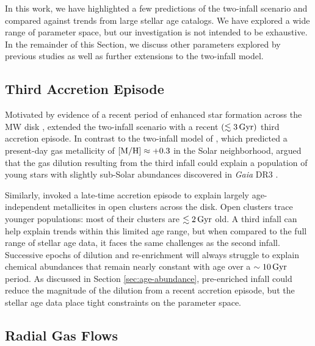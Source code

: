 \documentclass[twocolumn,twocolappendix,linenumbers]{aastex631}
\newcommand{\Gyr}{\,{\rm Gyr}}
\begin{document}
In this work, we have highlighted a few predictions of the two-infall scenario and compared against trends from large stellar age catalogs. We have explored a wide range of parameter space, but our investigation is not intended to be exhaustive. In the remainder of this Section, we discuss other parameters explored by previous studies as well as further extensions to the two-infall model.

\subsection{Third Accretion Episode}

Motivated by evidence of a recent period of enhanced star formation across the MW disk \citep{ruiz-lara_recurrent_2020}, \citet{spitoni_beyond_2023} extended the two-infall scenario with a recent $(\lesssim3\Gyr)$ third accretion episode. In contrast to the two-infall model of \citet{spitoni_apogee_2021}, which predicted a present-day gas metallicity of ${\rm [M/H]}\approx+0.3$ in the Solar neighborhood, \citet{spitoni_beyond_2023} argued that the gas dilution resulting from the third infall could explain a population of young stars with slightly sub-Solar abundances discovered in {\it Gaia} DR3 \citep{recio-blanco_gaia_2023}.

Similarly, \citet{palla_mapping_2024} invoked a late-time accretion episode to explain largely age-independent metallicites in open clusters across the disk. Open clusters trace younger populations: most of their clusters are $\lesssim2\Gyr$ old. A third infall can help explain trends within this limited age range, but when compared to the full range of stellar age data, it faces the same challenges as the second infall. Successive epochs of dilution and re-enrichment will always struggle to explain chemical abundances that remain nearly constant with age over a $\sim10\Gyr$ period. As discussed in Section \ref{sec:age-abundance}, pre-enriched infall could reduce the magnitude of the dilution from a recent accretion episode, but the stellar age data place tight constraints on the parameter space.

\subsection{Radial Gas Flows}
\label{sec:radial-flows}
\end{document}
